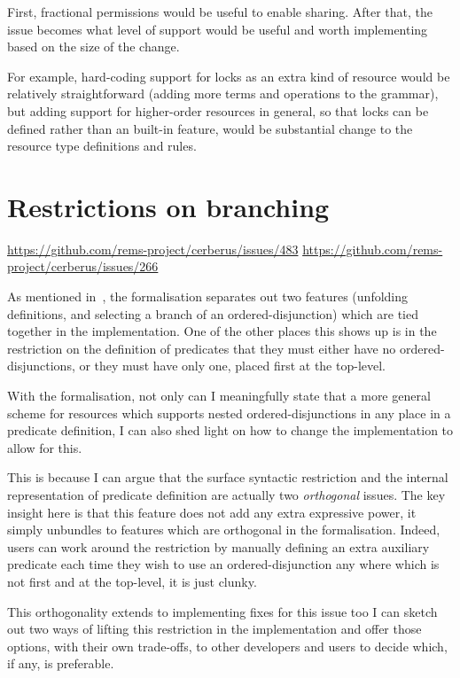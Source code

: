 First, fractional permissions would be useful to enable sharing. After that,
the issue becomes what level of support would be useful and worth implementing
based on the size of the change.

For example, hard-coding support for locks as an extra kind of resource would
be relatively straightforward (adding more terms and operations to the
grammar), but adding support for higher-order resources in general, so that
locks can be defined rather than an built-in feature, would be substantial
change to the resource type definitions and rules.

\section{Restrictions on branching}\label{sec:restriction-branching}
\url{https://github.com/rems-project/cerberus/issues/483}
\url{https://github.com/rems-project/cerberus/issues/266}

As mentioned in~, the formalisation
separates out two features (unfolding definitions, and selecting a branch of an
ordered-disjunction) which are tied together in the implementation. One of
the other places this shows up is in the restriction on the definition of
predicates that they must either have no ordered-disjunctions, or they
must have only one, placed first at the top-level.

With the formalisation, not only can I meaningfully state that a more general
scheme for resources which supports nested ordered-disjunctions in any place in
a predicate definition, I can also shed light on how to change the
implementation to allow for this.

This is because I can argue that the surface syntactic restriction and the
internal representation of predicate definition are actually two
\emph{orthogonal} issues. The key insight here is that this feature does not
add any extra expressive power, it simply unbundles to features which are
orthogonal in the formalisation. Indeed, users can work around the restriction
by manually defining an extra auxiliary predicate each time they wish to use an
ordered-disjunction any where which is not first and at the top-level, it is just
clunky.

This orthogonality extends to implementing fixes for this issue too
\textemdash{} I can sketch out two ways of lifting this restriction in the
implementation and offer those options, with their own trade-offs, to other
developers and users to decide which, if any, is preferable.

